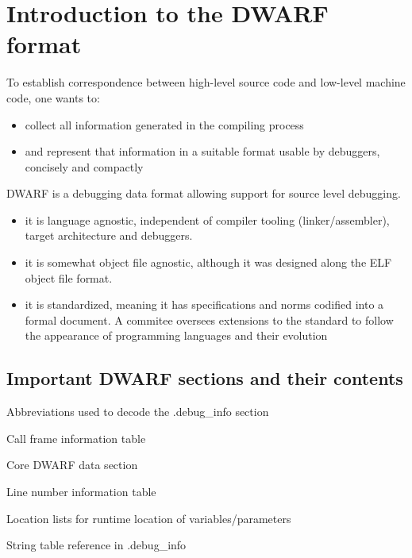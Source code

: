\chapter{Introduction to the DWARF format\label{cha:chapter2}}

To establish correspondence between high-level source code and low-level machine
code, one wants to:
\begin{itemize}
    \item collect all information generated in the compiling process
    \item and represent that information in a suitable format usable by debuggers, concisely and compactly
\end{itemize}

DWARF is a debugging data format allowing support for source level debugging.

\begin{itemize}
    \item it is language agnostic, independent of compiler tooling (linker/assembler), target architecture and debuggers.
    \item it is somewhat object file agnostic, although it was designed along the ELF object file format.
    \item it is standardized, meaning it has specifications and norms codified into
        a formal document. A commitee oversees extensions to the standard to
        follow the appearance of programming languages and their evolution
\end{itemize}

\section{Important DWARF sections and their contents}

\begin{description}[labelwidth=\widthof{\bfseries .debug\_abbrev},align=parright]
    \item[.debug\_abbrev] Abbreviations used to decode the .debug\_info section
    \item[.debug\_frame] Call frame information table
    \item[.debug\_info] Core DWARF data section
    \item[.debug\_line] Line number information table
    \item[.debug\_loc] Location lists for runtime location of variables/parameters
    \item[.debug\_str] String table reference in .debug\_info
\end{description}

